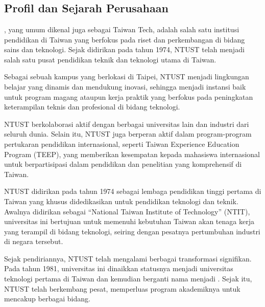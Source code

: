 \chapter{\babDua}

\section{Profil dan Sejarah Perusahaan}

\namaUniv, yang umum dikenal juga sebagai Taiwan Tech, adalah salah satu institusi pendidikan di Taiwan yang berfokus pada riset dan perkembangan di bidang sains dan teknologi. Sejak didirikan pada tahun 1974, NTUST telah menjadi salah satu pusat pendidikan teknik dan teknologi utama di Taiwan. \cite{ntust_history}

Sebagai sebuah kampus yang berlokasi di Taipei, NTUST menjadi lingkungan belajar yang dinamis dan mendukung inovasi, sehingga menjadi instansi baik untuk program magang ataupun kerja praktik yang berfokus pada peningkatan keterampilan teknis dan profesional di bidang teknologi.

NTUST berkolaborasi aktif dengan berbagai universitas lain dan industri dari seluruh dunia. Selain itu, NTUST juga berperan aktif dalam program-program pertukaran pendidikan internasional, seperti Taiwan Experience Education Program (TEEP), yang memberikan kesempatan kepada mahasiswa internasional untuk berpartisipasi dalam pendidikan dan penelitian yang komprehensif di Taiwan.

NTUST didirikan pada tahun 1974 sebagai lembaga pendidikan tinggi pertama di Taiwan yang khusus didedikasikan untuk pendidikan teknologi dan teknik. Awalnya didirikan sebagai ``National Taiwan Institute of Technology'' (NTIT), universitas ini bertujuan untuk memenuhi kebutuhan Taiwan akan tenaga kerja yang terampil di bidang teknologi, seiring dengan pesatnya pertumbuhan industri di negara tersebut.

Sejak pendiriannya, NTUST telah mengalami berbagai transformasi signifikan. Pada tahun 1981, universitas ini dinaikkan statusnya menjadi universitas teknologi pertama di Taiwan dan kemudian berganti nama menjadi \namaUniv. Sejak itu, NTUST telah berkembang pesat, memperluas program akademiknya untuk mencakup berbagai bidang. 

